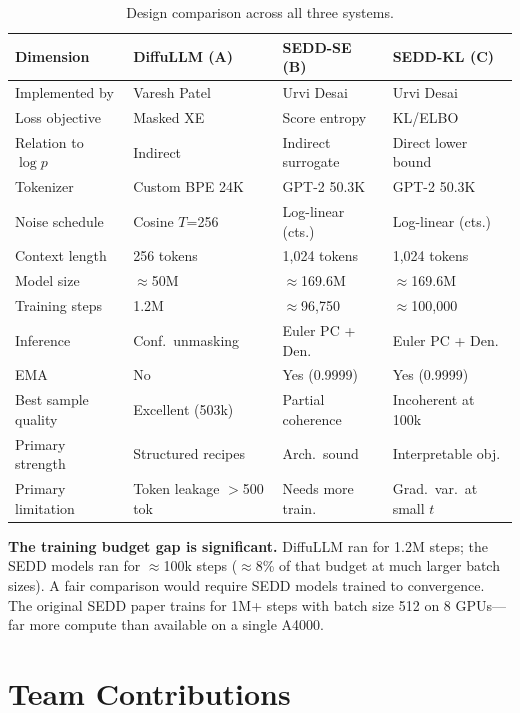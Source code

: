 \documentclass[11pt,a4paper]{article}
\begin{document}
\begin{table}[h]
\centering
\caption{Design comparison across all three systems.}
\label{tab:compare}
\small
\begin{tabular}{llll}
\toprule
Dimension & DiffuLLM (A) & SEDD-SE (B) & SEDD-KL (C) \\
\midrule
Implemented by   & Varesh Patel    & Urvi Desai        & Urvi Desai \\
Loss objective   & Masked XE       & Score entropy     & KL/ELBO \\
Relation to $\log p$ & Indirect    & Indirect surrogate & Direct lower bound \\
Tokenizer        & Custom BPE 24K  & GPT-2 50.3K       & GPT-2 50.3K \\
Noise schedule   & Cosine $T$=256  & Log-linear (cts.) & Log-linear (cts.) \\
Context length   & 256 tokens      & 1,024 tokens      & 1,024 tokens \\
Model size       & $\approx$50M    & $\approx$169.6M   & $\approx$169.6M \\
Training steps   & 1.2M            & $\approx$96,750   & $\approx$100,000 \\
Inference        & Conf.\ unmasking & Euler PC + Den.  & Euler PC + Den. \\
EMA              & No              & Yes (0.9999)      & Yes (0.9999) \\
Best sample quality & Excellent (503k) & Partial coherence & Incoherent at 100k \\
Primary strength & Structured recipes & Arch.\ sound    & Interpretable obj. \\
Primary limitation & Token leakage $>$500 tok & Needs more train. & Grad.\ var.\ at small $t$ \\
\bottomrule
\end{tabular}
\end{table}

\textbf{The training budget gap is significant.} DiffuLLM ran for 1.2M steps; the SEDD models ran for $\approx$100k steps ($\approx$8\% of that budget at much larger batch sizes). A fair comparison would require SEDD models trained to convergence. The original SEDD paper trains for 1M+ steps with batch size 512 on 8 GPUs---far more compute than available on a single A4000.

\section{Team Contributions}
\end{document}
